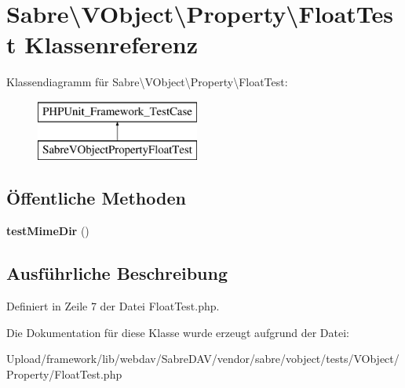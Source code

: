 \hypertarget{class_sabre_1_1_v_object_1_1_property_1_1_float_test}{}\section{Sabre\textbackslash{}V\+Object\textbackslash{}Property\textbackslash{}Float\+Test Klassenreferenz}
\label{class_sabre_1_1_v_object_1_1_property_1_1_float_test}
Klassendiagramm für Sabre\textbackslash{}V\+Object\textbackslash{}Property\textbackslash{}Float\+Test\+:\begin{figure}[H]
\begin{center}
\leavevmode
\includegraphics[height=2.000000cm]{class_sabre_1_1_v_object_1_1_property_1_1_float_test}
\end{center}
\end{figure}
\subsection*{Öffentliche Methoden}
\begin{DoxyCompactItemize}
\item 
\mbox{\label{class_sabre_1_1_v_object_1_1_property_1_1_float_test_a771efe57e62ebb95d42e8a15e3d9ff0b}} 
{\bfseries test\+Mime\+Dir} ()
\end{DoxyCompactItemize}


\subsection{Ausführliche Beschreibung}


Definiert in Zeile 7 der Datei Float\+Test.\+php.



Die Dokumentation für diese Klasse wurde erzeugt aufgrund der Datei\+:\begin{DoxyCompactItemize}
\item 
Upload/framework/lib/webdav/\+Sabre\+D\+A\+V/vendor/sabre/vobject/tests/\+V\+Object/\+Property/Float\+Test.\+php\end{DoxyCompactItemize}
